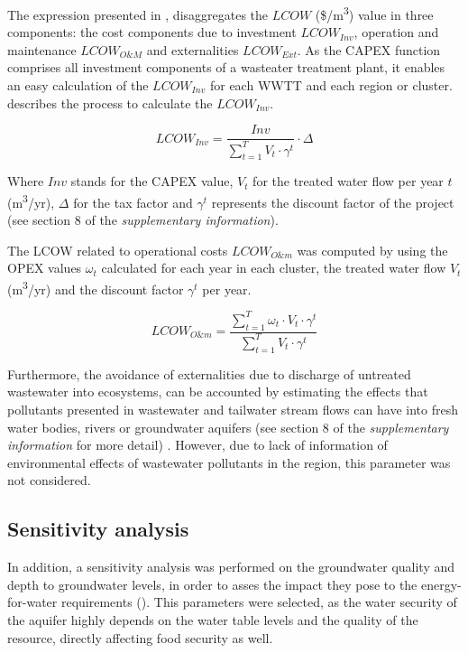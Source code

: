 The expression presented in , disaggregates the $LCOW$ (\$/m\textsuperscript{3}) value in three components: the cost components due to investment $LCOW_{Inv}$, operation and maintenance $LCOW_{O\&M}$ and externalities $LCOW_{Ext}$. As the CAPEX function comprises all investment components of a wasteater treatment plant, it enables an easy calculation of the $LCOW_{Inv}$ for each WWTT and each region or cluster.  describes the process to calculate the $LCOW_{Inv}$.

\begin{equation}\label{eq:lcowinv}
LCOW_{Inv} = \frac{Inv}{\sum_{t=1}^{T} V_{t}\cdot\gamma^{t}}\cdot\Delta
\end{equation}

Where $Inv$ stands for the CAPEX value, $V_{t}$ for the treated water flow per year $t$ (m\textsuperscript{3}/yr), $\Delta$ for the tax factor and $\gamma^{t}$ represents the discount factor of the project (see section 8 of the \textit{supplementary information}).

The LCOW related to operational costs $LCOW_{O\&m}$  was computed by using the OPEX values $\omega_{t}$ calculated for each year in each cluster, the treated water flow $V_{t}$ (m\textsuperscript{3}/yr) and the discount factor $\gamma^t$ per year.

\begin{equation}\label{eq:lcowom}
LCOW_{O\&m} = \frac{\sum_{t=1}^{T} \omega_{t}\cdot V_{t}\cdot\gamma^{t}}{\sum_{t=1}^{T} V_{t}\cdot\gamma^{t}}
\end{equation}

Furthermore, the avoidance of externalities due to discharge of untreated wastewater into ecosystems, can be accounted by estimating the effects that pollutants presented in wastewater and tailwater stream flows can have into fresh water bodies, rivers or groundwater aquifers (see section 8 of the \textit{supplementary information} for more detail) \cite{Assessmentwastewatertreatment2012}. However, due to lack of information of environmental effects of wastewater pollutants in the region, this parameter was not considered.

\subsection{Sensitivity analysis}\label{sec:sensitivity} %
In addition, a sensitivity analysis was performed on the groundwater quality and depth to groundwater levels, in order to asses the impact they pose to the energy-for-water requirements (). This parameters were selected, as the water security of the aquifer highly depends on the water table levels and the quality of the resource, directly affecting food security as well.


